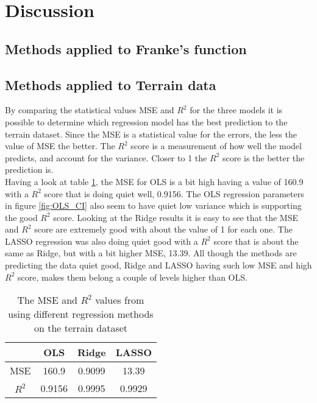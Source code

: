 \documentclass[../main.tex]{subfiles}
\begin{document}
\section{Discussion}\label{sec:discussion}
\subsection{Methods applied to Franke's function}

\subsection{Methods applied to Terrain data}
By comparing the statistical values MSE and $R^2$ for the three models it is possible to determine which regression model has the best prediction to the terrain dataset. Since the MSE is a statistical value for the errors, the less the value of MSE the better. The $R^2$ score is a measurement of how well the model predicts, and account for the variance. Closer to 1 the $R^2$ score is the better the prediction is.\\

Having a look at table \ref{tab:statistical_results}, the MSE for OLS is a bit high having a value of 160.9 with a $R^2$ score that is doing quiet well, 0.9156. The OLS regression parameters in figure \ref{fig:OLS_CI} also seem to have quiet low variance which is supporting the good $R^2$ score. Looking at the Ridge results it is easy to see that the MSE and $R^2$ score are extremely good with about the value of 1 for each one. The LASSO regression was also doing quiet good with a $R^2$ score that is about the same as Ridge, but with a bit higher MSE, 13.39.  All though the methods are predicting the data quiet good, Ridge and LASSO having such low MSE and high $R^2$ score, makes them belong a couple of levels higher than OLS.

\begin{table}[H]
\begin{center}
\begin{tabular}{ |c|c|c|c| } 
 \hline
  & OLS & Ridge & LASSO \\ 
 \hline
 MSE & 160.9 & 0.9099 & 13.39\\
 \hline
 $R^2$ & 0.9156 & 0.9995 & 0.9929 \\ 
 \hline
\end{tabular}
\label{tab:statistical_results}
\caption{The MSE and $R^2$ values from using different regression methods on the terrain dataset}
\end{center}
\end{table}
\end{document}
